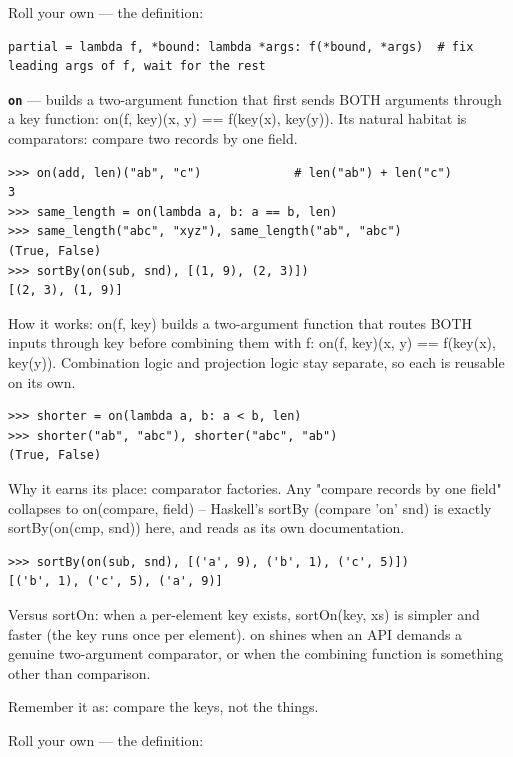 \documentclass[10pt,letterpaper]{article}
\begin{document}
Roll your own --- the definition:

\begin{lstlisting}[style=ex]
partial = lambda f, *bound: lambda *args: f(*bound, *args)  # fix leading args of f, wait for the rest
\end{lstlisting}
\textbf{\texttt{on}} --- builds a two-argument function that first sends BOTH arguments through a key function: on(f, key)(x, y) == f(key(x), key(y)). Its natural habitat is comparators: compare two records by one field.
\begin{lstlisting}[style=ex]
>>> on(add, len)("ab", "c")             # len("ab") + len("c")
3
>>> same_length = on(lambda a, b: a == b, len)
>>> same_length("abc", "xyz"), same_length("ab", "abc")
(True, False)
>>> sortBy(on(sub, snd), [(1, 9), (2, 3)])
[(2, 3), (1, 9)]
\end{lstlisting}

How it works: on(f, key) builds a two-argument function that routes BOTH inputs through key before combining them with f: on(f, key)(x, y) == f(key(x), key(y)). Combination logic and projection logic stay separate, so each is reusable on its own.

\begin{lstlisting}[style=ex]
>>> shorter = on(lambda a, b: a < b, len)
>>> shorter("ab", "abc"), shorter("abc", "ab")
(True, False)
\end{lstlisting}

Why it earns its place: comparator factories. Any "compare records by one field" collapses to on(compare, field) -- Haskell's sortBy (compare 'on' snd) is exactly sortBy(on(cmp, snd)) here, and reads as its own documentation.

\begin{lstlisting}[style=ex]
>>> sortBy(on(sub, snd), [('a', 9), ('b', 1), ('c', 5)])
[('b', 1), ('c', 5), ('a', 9)]
\end{lstlisting}

Versus sortOn: when a per-element key exists, sortOn(key, xs) is simpler and faster (the key runs once per element). on shines when an API demands a genuine two-argument comparator, or when the combining function is something other than comparison.


Remember it as: compare the keys, not the things.


Roll your own --- the definition:
\end{document}
